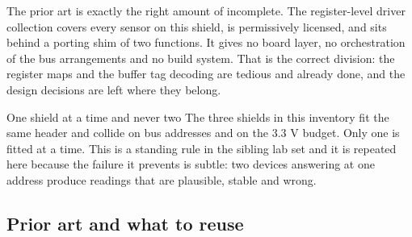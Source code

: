 The prior art is exactly the right amount of incomplete. The register-level
driver collection covers every sensor on this shield, is permissively licensed,
and sits behind a porting shim of two functions. It gives no board layer, no
orchestration of the bus arrangements and no build system. That is the correct
division: the register maps and the buffer tag decoding are tedious and already
done, and the design decisions are left where they belong.

\begin{note}{One shield at a time and never two}
The three shields in this inventory fit the same header and collide on bus
addresses and on the 3.3 V budget. Only one is fitted at a time. This is a
standing rule in the sibling lab set and it is repeated here because the failure
it prevents is subtle: two devices answering at one address produce readings that
are plausible, stable and wrong.
\end{note}

\subsection*{Prior art and what to reuse}

